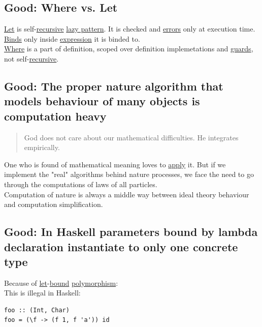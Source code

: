\documentclass[11pt]{article}
\begin{document}
\subsection{\label{orgaf17466}Good: Where vs. Let}
\label{sec:org16cdf2e}
\hyperref[org6b52ae3]{Let} is self-\hyperref[org06bac4d]{recursive} \hyperref[org263341c]{lazy pattern}. It is checked and \hyperref[orgaf8d923]{errors} only at execution time. \hyperref[org4d3a6be]{Binds} only inside \hyperref[org667db83]{expression} it is binded to.\\

\hyperref[orgefd1ecd]{Where} is a part of definition, scoped over definition implemetations and \hyperref[orge8adc07]{guards}, not self-\hyperref[org06bac4d]{recursive}.\\

\subsection{\label{org8047097}Good: The proper nature algorithm that models behaviour of many objects is computation heavy}
\label{sec:org31df48b}
\begin{quote}
God does not care about our mathematical difficulties. He integrates empirically.\\
\end{quote}

One who is found of mathematical meaning loves to \hyperref[orgfed746a]{apply} it. But if we implement the "real" algorithms behind nature processes, we face the need to go through the computations of laws of all particles.\\

Computation of nature is always a middle way between ideal theory behaviour and computation simplification.\\

\subsection{\label{org59cb7cd}Good: In Haskell parameters bound by lambda declaration instantiate to only one concrete type}
\label{sec:orgc17833d}
Because of \hyperref[org6b52ae3]{let}-\hyperref[org7d65bda]{bound} \hyperref[org4bdf515]{polymorphism}:\\

This is illegal in Haskell:\\
\begin{verbatim}
foo :: (Int, Char)
foo = (\f -> (f 1, f 'a')) id
\end{verbatim}
\end{document}
